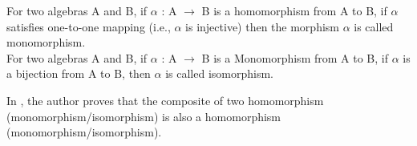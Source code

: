 For two algebras A and B, if \(\alpha\) : A \(\rightarrow\) B  is a homomorphism from A to B, if \(\alpha\) satisfies one-to-one mapping (i.e., \(\alpha\) is injective) then the morphism \(\alpha\) is called monomorphism. \\

For two algebras A and B, if \(\alpha\) : A \(\rightarrow\) B  is a Monomorphism from A to B, if \(\alpha\) is a bijection from A to B, then \(\alpha\) is called isomorphism.

In \cite{sankappanavar1981course}, the author proves that the composite of two homomorphism (monomorphism/isomorphism) is also a homomorphism (monomorphism/isomorphism).
